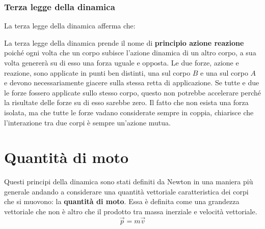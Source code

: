 \documentclass[10pt,a4paper]{book}
\begin{document}
\subsubsection{Terza legge della dinamica}

La terza legge della dinamica afferma che:

\noindent{}

La terza legge della dinamica prende il nome di \textbf{principio azione reazione} poiché ogni volta che un corpo subisce l'azione dinamica di un altro corpo, a sua volta genererà su di esso una forza uguale e opposta. Le due forze, azione e reazione, sono applicate in punti ben distinti, una sul corpo $B$ e una sul corpo $A$ e devono necessariamente giacere sulla stessa retta di applicazione. Se tutte e due le forze fossero applicate sullo stesso corpo, questo non potrebbe accelerare perché la risultate delle forze su di esso sarebbe zero. Il fatto che non esista una forza isolata, ma che tutte le forze vadano considerate sempre in coppia, chiarisce che l'interazione tra due corpi è sempre un'azione mutua.







































\section{Quantità di moto}

Questi principi della dinamica sono stati definiti da Newton in una maniera più generale andando a considerare una quantità vettoriale caratteristica dei corpi che si muovono: la \textbf{quantità di moto}. Essa è definita come una grandezza vettoriale che non è altro che il prodotto tra massa inerziale e velocità vettoriale.
\[
	\vec{p}=m\vec{v}
\]
\end{document}
